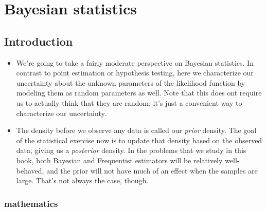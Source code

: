 

\chapter{Bayesian statistics}

\section{Introduction}

\begin{itemize}

\item We're going to take a fairly moderate perspective on Bayesian
  statistics.  In contrast to point estimation or hypothesis testing,
  here we characterize our uncertainty about the unknown parameters of
  the likelihood function by modeling them as random parameters as
  well.  Note that this does ont require us to actually think that
  they are random; it's just a convenient way to characterize our
  uncertainty.

\item The density before we observe any data is called our
  \emph{prior} density.  The goal of the statistical exercise now is
  to update that density based on the observed data, giving us a
  \emph{posterior} density.  In the problems that we study in this
  book, both Bayesian and Frequentist estimators will be relatively
  well-behaved, and the prior will not have much of an effect when the
  samples are large.  That's not always the case, though.

\end{itemize}

\subsection{mathematics}

